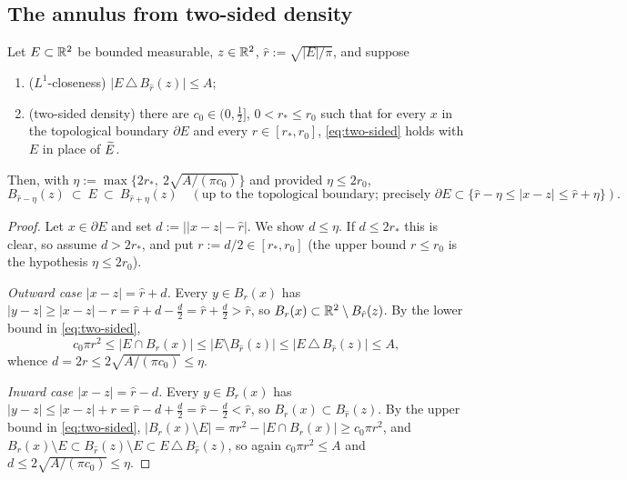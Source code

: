 \subsection{The annulus from two-sided density}

\begin{lemma}\label{lem:chunk}
Let $E\subset\mathbb{R}^2$ be bounded measurable, $z\in\mathbb{R}^2$,
$\hat r:=\sqrt{|E|/\pi}$, and suppose
\begin{enumerate}[label=\textup{(\alph*)},leftmargin=2.2em]
\item \textup{($L^1$-closeness)} $|E\,\triangle\,B_{\hat r}(z)|\le A$;
\item \textup{(two-sided density)} there are $c_0\in(0,\tfrac12]$,
$0<r_*\le r_0$ such that for every $x$ in the topological boundary
$\partial E$ and every $r\in[r_*,r_0]$, \eqref{eq:two-sided} holds with $E$
in place of $\widetilde E$.
\end{enumerate}
Then, with $\eta:=\max\bigl\{2r_*,\ 2\sqrt{A/(\pi c_0)}\bigr\}$ and
provided $\eta\le 2r_0$,
\begin{equation}\label{eq:dens-annulus}
   B_{\hat r-\eta}(z)\ \subset\ E\ \subset\ B_{\hat r+\eta}(z)
   \quad(\text{up to the topological boundary; precisely }
   \partial E\subset\{\hat r-\eta\le|x-z|\le\hat r+\eta\}).
\end{equation}
\end{lemma}

\begin{proof}
Let $x\in\partial E$ and set $d:=\bigl||x-z|-\hat r\bigr|$. We show
$d\le\eta$. If $d\le2r_*$ this is clear, so assume $d>2r_*$, and put
$r:=d/2\in[r_*,r_0]$ (the upper bound $r\le r_0$ is the hypothesis
$\eta\le2r_0$).

\emph{Outward case $|x-z|=\hat r+d$.} Every $y\in B_{r}(x)$ has
$|y-z|\ge|x-z|-r=\hat r+d-\tfrac d2=\hat r+\tfrac d2>\hat r$, so
$B_r(x)\subset\mathbb{R}^2\setminus B_{\hat r}(z)$. By the lower bound in
\eqref{eq:two-sided},
\[
   c_0\pi r^2\le|E\cap B_r(x)|\le|E\setminus B_{\hat r}(z)|
   \le|E\,\triangle\,B_{\hat r}(z)|\le A,
\]
whence $d=2r\le2\sqrt{A/(\pi c_0)}\le\eta$.

\emph{Inward case $|x-z|=\hat r-d$.} Every $y\in B_r(x)$ has
$|y-z|\le|x-z|+r=\hat r-d+\tfrac d2=\hat r-\tfrac d2<\hat r$, so
$B_r(x)\subset B_{\hat r}(z)$. By the upper bound in \eqref{eq:two-sided},
$|B_r(x)\setminus E|=\pi r^2-|E\cap B_r(x)|\ge c_0\pi r^2$, and
$B_r(x)\setminus E\subset B_{\hat r}(z)\setminus E\subset
E\,\triangle\,B_{\hat r}(z)$, so again $c_0\pi r^2\le A$ and
$d\le2\sqrt{A/(\pi c_0)}\le\eta$.
\end{proof}

